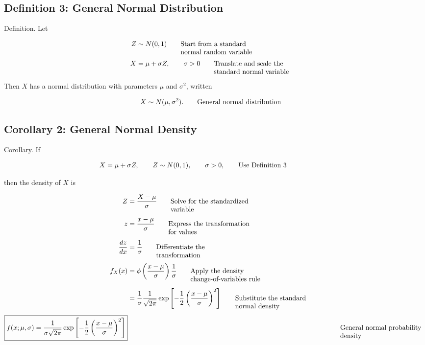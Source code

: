 \documentclass{article}
\newcommand{\justwidth}{0.36\textwidth}
\newcommand{\just}[1]{\parbox[t]{\justwidth}{\raggedright #1}}
\begin{document}
\subsection{Definition 3: General Normal Distribution}
Definition. Let

\begin{align*}
Z
&\sim
N(0,1)
\tag*{\just{Start from a standard normal random variable}}
\\[0.45em]
X
&=
\mu+\sigma Z,
\qquad
\sigma>0
\tag*{\just{Translate and scale the standard normal variable}}
\end{align*}

Then $X$ has a normal distribution with parameters $\mu$ and $\sigma^2$, written

\begin{align*}
X
&\sim
N(\mu,\sigma^2).
\tag*{\just{General normal distribution}}
\end{align*}

\subsection{Corollary 2: General Normal Density}
Corollary. If

\begin{align*}
X
&=
\mu+\sigma Z,
\qquad
Z\sim N(0,1),
\qquad
\sigma>0,
\tag*{\just{Use Definition 3}}
\end{align*}

then the density of $X$ is

\begin{align*}
Z
&=
\frac{X-\mu}{\sigma}
\tag*{\just{Solve for the standardized variable}}
\\[0.45em]
z
&=
\frac{x-\mu}{\sigma}
\tag*{\just{Express the transformation for values}}
\\[0.45em]
\frac{dz}{dx}
&=
\frac{1}{\sigma}
\tag*{\just{Differentiate the transformation}}
\\[0.45em]
f_X(x)
&=
\phi\left(
\frac{x-\mu}{\sigma}
\right)
\frac{1}{\sigma}
\tag*{\just{Apply the density change-of-variables rule}}
\\[0.45em]
&=
\frac{1}{\sigma}
\frac{1}{\sqrt{2\pi}}
\exp\left[
-\frac{1}{2}
\left(
\frac{x-\mu}{\sigma}
\right)^2
\right]
\tag*{\just{Substitute the standard normal density}}
\\[0.45em]
\boxed{
f(x;\mu,\sigma)
=
\frac{1}{\sigma\sqrt{2\pi}}
\exp\left[
-\frac{1}{2}
\left(
\frac{x-\mu}{\sigma}
\right)^2
\right]
}
&&
\tag*{\just{General normal probability density}}
\end{align*}
\end{document}
